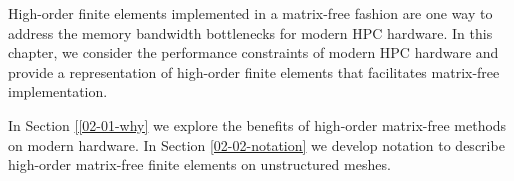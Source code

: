 High-order finite elements implemented in a matrix-free fashion are one way to address the memory bandwidth bottlenecks for modern HPC hardware.
In this chapter, we consider the performance constraints of modern HPC hardware and provide a representation of high-order finite elements that facilitates matrix-free implementation.

In Section \ref{[02-01-why} we explore the benefits of high-order matrix-free methods on modern hardware.
In Section \ref{02-02-notation} we develop notation to describe high-order matrix-free finite elements on unstructured meshes.
